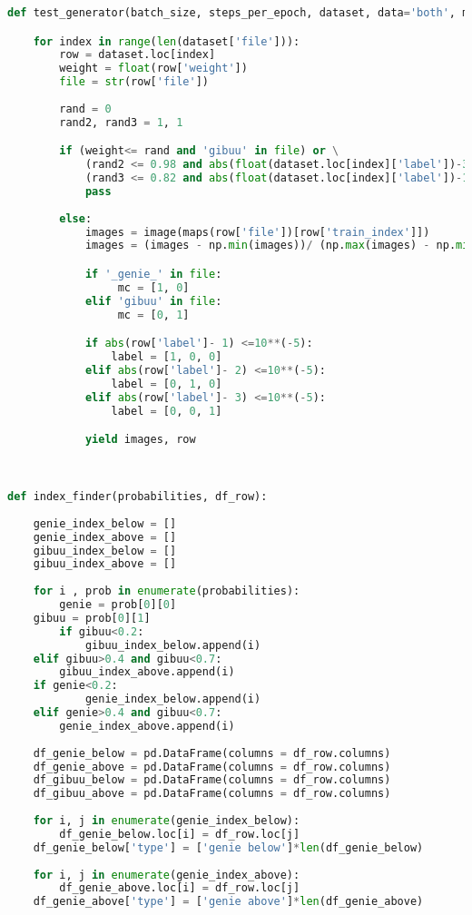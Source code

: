 \begin{lstlisting}[language=Python]
def test_generator(batch_size, steps_per_epoch, dataset, data='both', model_type = 'default'):

    for index in range(len(dataset['file'])):
        row = dataset.loc[index]
        weight = float(row['weight'])
        file = str(row['file'])
    
        rand = 0
        rand2, rand3 = 1, 1

        if (weight<= rand and 'gibuu' in file) or \
            (rand2 <= 0.98 and abs(float(dataset.loc[index]['label'])-3)<=10**(-5)) or \
            (rand3 <= 0.82 and abs(float(dataset.loc[index]['label'])-1)<=10**(-5)):
            pass
        
        else:
            images = image(maps(row['file'])[row['train_index']])
            images = (images - np.min(images))/ (np.max(images) - np.min(images))

            if '_genie_' in file:
                 mc = [1, 0]
            elif 'gibuu' in file:
                 mc = [0, 1]

            if abs(row['label']- 1) <=10**(-5):
                label = [1, 0, 0]
            elif abs(row['label']- 2) <=10**(-5):
                label = [0, 1, 0]
            elif abs(row['label']- 3) <=10**(-5):
                label = [0, 0, 1]

            yield images, row

			

def index_finder(probabilities, df_row):
	
    genie_index_below = []
    genie_index_above = []
    gibuu_index_below = []
    gibuu_index_above = []
	
    for i , prob in enumerate(probabilities):
        genie = prob[0][0]
	gibuu = prob[0][1]
        if gibuu<0.2:
            gibuu_index_below.append(i)
	elif gibuu>0.4 and gibuu<0.7:
	    gibuu_index_above.append(i)
	if genie<0.2:
            genie_index_below.append(i)
	elif genie>0.4 and gibuu<0.7:
	    genie_index_above.append(i)
		
    df_genie_below = pd.DataFrame(columns = df_row.columns)
    df_genie_above = pd.DataFrame(columns = df_row.columns)
    df_gibuu_below = pd.DataFrame(columns = df_row.columns) 
    df_gibuu_above = pd.DataFrame(columns = df_row.columns)
	
    for i, j in enumerate(genie_index_below):
        df_genie_below.loc[i] = df_row.loc[j]
	df_genie_below['type'] = ['genie below']*len(df_genie_below)
	
    for i, j in enumerate(genie_index_above):
        df_genie_above.loc[i] = df_row.loc[j]
	df_genie_above['type'] = ['genie above']*len(df_genie_above)
	

\end{lstlisting}
